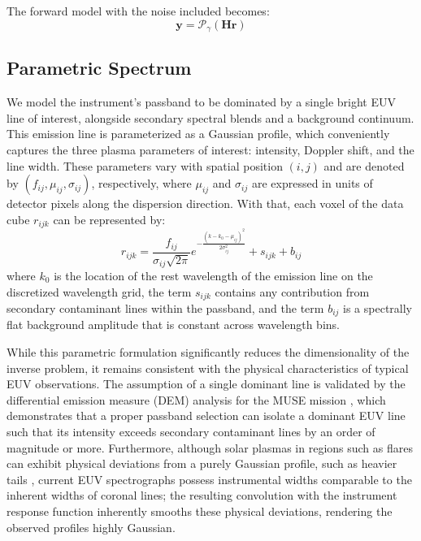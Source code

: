 \documentclass[linenumbers,twocolumn]{aastex7}
\begin{document}
The forward model with the noise included becomes: 
\begin{equation}
    \bm y = \mathcal{P}_\gamma(\bm H \bm r)
\end{equation}

\subsection{Parametric Spectrum}
We model the instrument's passband to be dominated by a single bright EUV line
of interest, alongside secondary spectral blends and a background continuum.
This emission line is parameterized as a Gaussian profile, which conveniently
captures the three plasma parameters of interest: intensity, Doppler shift, and
the line width. These parameters vary with spatial position $(i,j)$ and are
denoted by $(f_{ij}, \mu_{ij}, \sigma_{ij})$, respectively, where $\mu_{ij}$ and
$\sigma_{ij}$ are expressed in units of detector pixels along the dispersion
direction. With that, each voxel of the data cube $r_{ijk}$ can be represented
by:
\begin{equation}
r_{ijk} 
= \frac{f_{ij}}{\sigma_{ij}\sqrt{2\pi}}
e^{-\frac{(k-k_0-\mu_{ij})^2}{2\sigma_{ij}^2}} + s_{ijk} + b_{ij}
\label{eq:param_voxel}
\end{equation}
where $k_0$ is the location of the rest wavelength of the emission line on the
discretized wavelength grid, the term $s_{ijk}$ contains any contribution from
secondary contaminant lines within the passband, and the term $b_{ij}$ is a
spectrally flat background amplitude that is constant across wavelength bins.

While this parametric formulation significantly reduces the dimensionality of
the inverse problem, it remains consistent with the physical characteristics of
typical EUV observations. The assumption of a single dominant line is
validated by the differential emission measure (DEM) analysis for the MUSE
mission \citep{de2019multi}, which demonstrates that a proper passband selection
can isolate a dominant EUV line such that its intensity exceeds secondary
contaminant lines by an order of magnitude or more.  Furthermore, although solar
plasmas in regions such as flares can exhibit physical deviations from a purely
Gaussian profile, such as heavier tails \citep{lorinvcik2020plasma}, current EUV
spectrographs possess instrumental widths comparable to the inherent widths of
coronal lines; the resulting convolution with the instrument response function
inherently smooths these physical deviations, rendering the observed profiles
highly Gaussian. 
\end{document}
